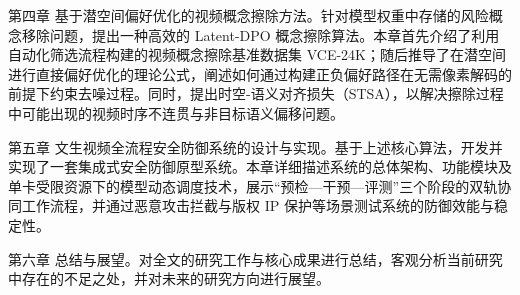 第四章 基于潜空间偏好优化的视频概念擦除方法。针对模型权重中存储的风险概念移除问题，提出一种高效的 Latent-DPO 概念擦除算法。本章首先介绍了利用自动化筛选流程构建的视频概念擦除基准数据集 VCE-24K；随后推导了在潜空间进行直接偏好优化的理论公式，阐述如何通过构建正负偏好路径在无需像素解码的前提下约束去噪过程。同时，提出时空-语义对齐损失（STSA），以解决擦除过程中可能出现的视频时序不连贯与非目标语义偏移问题。

第五章 文生视频全流程安全防御系统的设计与实现。基于上述核心算法，开发并实现了一套集成式安全防御原型系统。本章详细描述系统的总体架构、功能模块及单卡受限资源下的模型动态调度技术，展示“预检—干预—评测”三个阶段的双轨协同工作流程，并通过恶意攻击拦截与版权 IP 保护等场景测试系统的防御效能与稳定性。

第六章 总结与展望。对全文的研究工作与核心成果进行总结，客观分析当前研究中存在的不足之处，并对未来的研究方向进行展望。
